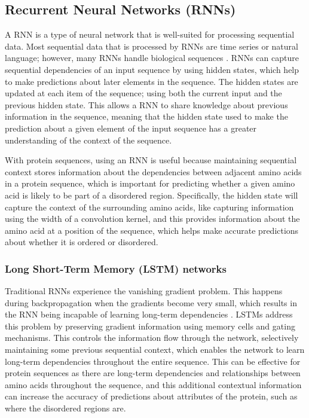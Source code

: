 \documentclass{l4proj}
\begin{document}
\subsection{Recurrent Neural Networks (RNNs)}
\label{chap:background sec:RNN}

A RNN is a type of neural network that is well-suited for processing sequential data. Most sequential data that is processed by RNNs are time series or natural language; however, many RNNs handle biological sequences \citep{Hawkins:05}. RNNs can capture sequential dependencies of an input sequence by using hidden states, which help to make predictions about later elements in the sequence. The hidden states are updated at each item of the sequence; using both the current input and the previous hidden state. This allows a RNN to share knowledge about previous information in the sequence, meaning that the hidden state used to make the prediction about a given element of the input sequence has a greater understanding of the context of the sequence.

With protein sequences, using an RNN is useful because maintaining sequential context stores information about the dependencies between adjacent amino acids in a protein sequence, which is important for predicting whether a given amino acid is likely to be part of a disordered region. Specifically, the hidden state will capture the context of the surrounding amino acids, like capturing information using the width of a convolution kernel, and this provides information about the amino acid at a position of the sequence, which helps make accurate predictions about whether it is ordered or disordered. \\

\subsubsection{Long Short-Term Memory (LSTM) networks \newline}

Traditional RNNs experience the vanishing gradient problem. This happens during backpropagation when the gradients become very small, which results in the RNN being incapable of learning long-term dependencies \citep{Arbel:18}. LSTMs address this problem by preserving gradient information using memory cells and gating mechanisms. This controls the information flow through the network, selectively maintaining some previous sequential context, which enables the network to learn long-term dependencies throughout the entire sequence. This can be effective for protein sequences as there are long-term dependencies and relationships between amino acids throughout the sequence, and this additional contextual information can increase the accuracy of predictions about attributes of the protein, such as where the disordered regions are.
\end{document}
